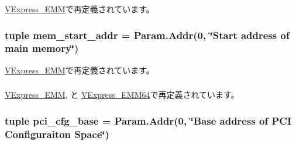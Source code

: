 \hyperlink{classRealView_1_1VExpress__EMM_ad117287c3578a335336372971d237cce}{VExpress\_\-EMM}で再定義されています。\hypertarget{classRealView_1_1RealView_affd713b1717e14a6268fd6dd5c1c695f}{
\subsubsection[{mem\_\-start\_\-addr}]{\setlength{\rightskip}{0pt plus 5cm}tuple {\bf mem\_\-start\_\-addr} = {\bf Param.Addr}(0, \char`\"{}Start address of main memory\char`\"{})}}
\label{classRealView_1_1RealView_affd713b1717e14a6268fd6dd5c1c695f}


\hyperlink{classRealView_1_1VExpress__EMM_a36ef458632b618b443f831f05ce3296e}{VExpress\_\-EMM}で再定義されています。\hypertarget{classRealView_1_1RealView_abcf52781f9ca2926e1f879ceecb4865c}{
\subsubsection[{nvmem}]{}}
\label{classRealView_1_1RealView_abcf52781f9ca2926e1f879ceecb4865c}


\hyperlink{classRealView_1_1VExpress__EMM_abcf52781f9ca2926e1f879ceecb4865c}{VExpress\_\-EMM}, と \hyperlink{classRealView_1_1VExpress__EMM64_abcf52781f9ca2926e1f879ceecb4865c}{VExpress\_\-EMM64}で再定義されています。\hypertarget{classRealView_1_1RealView_ae33825da8d9785badce3e6a89e61b1fe}{
\subsubsection[{pci\_\-cfg\_\-base}]{\setlength{\rightskip}{0pt plus 5cm}tuple {\bf pci\_\-cfg\_\-base} = {\bf Param.Addr}(0, \char`\"{}Base address of PCI Configuraiton Space\char`\"{})}}
\label{classRealView_1_1RealView_ae33825da8d9785badce3e6a89e61b1fe}


